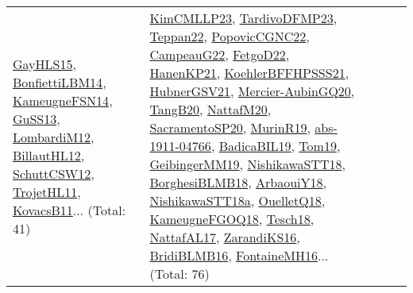 {\begin{longtable}{lp{3cm}>{\raggedright}p{6cm}>{\raggedright}p{6cm}p{8cm}}
\href{papers/GayHLS15.pdf}{GayHLS15}\cite{GayHLS15}, \href{articles/BonfiettiLBM14.pdf}{BonfiettiLBM14}\cite{BonfiettiLBM14}, \href{articles/KameugneFSN14.pdf}{KameugneFSN14}\cite{KameugneFSN14}, \href{papers/GuSS13.pdf}{GuSS13}\cite{GuSS13}, \href{articles/LombardiM12.pdf}{LombardiM12}\cite{LombardiM12}, \href{papers/BillautHL12.pdf}{BillautHL12}\cite{BillautHL12}, \href{papers/SchuttCSW12.pdf}{SchuttCSW12}\cite{SchuttCSW12}, \href{articles/TrojetHL11.pdf}{TrojetHL11}\cite{TrojetHL11}, \href{articles/KovacsB11.pdf}{KovacsB11}\cite{KovacsB11}... (Total: 41) & \href{papers/KimCMLLP23.pdf}{KimCMLLP23}\cite{KimCMLLP23}, \href{papers/TardivoDFMP23.pdf}{TardivoDFMP23}\cite{TardivoDFMP23}, \href{papers/Teppan22.pdf}{Teppan22}\cite{Teppan22}, \href{papers/PopovicCGNC22.pdf}{PopovicCGNC22}\cite{PopovicCGNC22}, \href{articles/CampeauG22.pdf}{CampeauG22}\cite{CampeauG22}, \href{articles/FetgoD22.pdf}{FetgoD22}\cite{FetgoD22}, \href{papers/HanenKP21.pdf}{HanenKP21}\cite{HanenKP21}, \href{articles/KoehlerBFFHPSSS21.pdf}{KoehlerBFFHPSSS21}\cite{KoehlerBFFHPSSS21}, \href{articles/HubnerGSV21.pdf}{HubnerGSV21}\cite{HubnerGSV21}, \href{papers/Mercier-AubinGQ20.pdf}{Mercier-AubinGQ20}\cite{Mercier-AubinGQ20}, \href{papers/TangB20.pdf}{TangB20}\cite{TangB20}, \href{papers/NattafM20.pdf}{NattafM20}\cite{NattafM20}, \href{articles/SacramentoSP20.pdf}{SacramentoSP20}\cite{SacramentoSP20}, \href{papers/MurinR19.pdf}{MurinR19}\cite{MurinR19}, \href{articles/abs-1911-04766.pdf}{abs-1911-04766}\cite{abs-1911-04766}, \href{papers/BadicaBIL19.pdf}{BadicaBIL19}\cite{BadicaBIL19}, \href{papers/Tom19.pdf}{Tom19}\cite{Tom19}, \href{papers/GeibingerMM19.pdf}{GeibingerMM19}\cite{GeibingerMM19}, \href{papers/NishikawaSTT18.pdf}{NishikawaSTT18}\cite{NishikawaSTT18}, \href{articles/BorghesiBLMB18.pdf}{BorghesiBLMB18}\cite{BorghesiBLMB18}, \href{papers/ArbaouiY18.pdf}{ArbaouiY18}\cite{ArbaouiY18}, \href{papers/NishikawaSTT18a.pdf}{NishikawaSTT18a}\cite{NishikawaSTT18a}, \href{papers/OuelletQ18.pdf}{OuelletQ18}\cite{OuelletQ18}, \href{papers/KameugneFGOQ18.pdf}{KameugneFGOQ18}\cite{KameugneFGOQ18}, \href{papers/Tesch18.pdf}{Tesch18}\cite{Tesch18}, \href{articles/NattafAL17.pdf}{NattafAL17}\cite{NattafAL17}, \href{articles/ZarandiKS16.pdf}{ZarandiKS16}\cite{ZarandiKS16}, \href{articles/BridiBLMB16.pdf}{BridiBLMB16}\cite{BridiBLMB16}, \href{papers/FontaineMH16.pdf}{FontaineMH16}\cite{FontaineMH16}... (Total: 76)\\

\end{longtable}}
